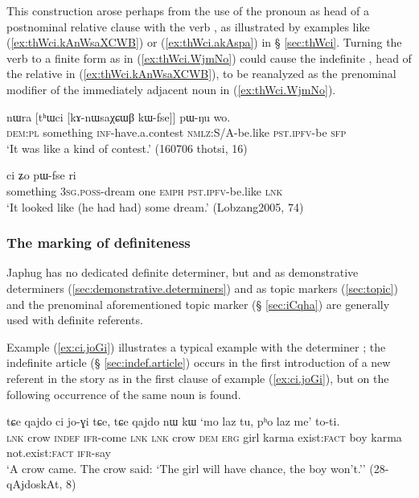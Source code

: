  This construction arose perhaps from the use of the pronoun  as head of a postnominal relative clause with the verb , as illustrated by examples like (\ref{ex:thWci.kAnWsaXCWB}) or (\ref{ex:thWci.akAspa}) in § \ref{sec:thWci}. Turning the verb  to a finite form as in (\ref{ex:thWci.WjmNo}) could cause the indefinite , head of the relative in (\ref{ex:thWci.kAnWsaXCWB}), to be reanalyzed as the prenominal modifier of the immediately adjacent noun in (\ref{ex:thWci.WjmNo}).

 \begin{exe}
\ex \label{ex:thWci.kAnWsaXCWB}
\gll nɯra [tʰɯci [kɤ-nɯsaχɕɯβ kɯ-fse]] pɯ-ŋu wo.  \\
\textsc{dem}:\textsc{pl} something \textsc{inf}-have.a.contest \textsc{nmlz}:S/A-be.like \textsc{pst}.\textsc{ipfv}-be \textsc{sfp} \\
\glt `It was like a kind of contest.' (160706 thotsi, 16)
 \end{exe}
 
\begin{exe}
\ex \label{ex:thWci.WjmNo}
 ci ʑo pɯ-fse ri \\
something \textsc{3sg}.\textsc{poss}-dream one \textsc{emph} \textsc{pst}.\textsc{ipfv}-be.like \textsc{lnk} \\
\glt `It looked like (he had had) some dream.' (Lobzang2005, 74)
 \end{exe}
 
 
\subsubsection{The marking of definiteness} \label{sec:definiteness}
Japhug has no dedicated definite determiner, but   and   as demonstrative determiners (\ref{sec:demonstrative.determiners}) and as topic markers (\ref{sec:topic}) and the prenominal aforementioned topic marker  (§ \ref{sec:iCqha}) are generally used with definite referents.  

Example (\ref{ex:ci.joGi}) illustrates a typical example with the determiner ; the indefinite article  (§ \ref{sec:indef.article}) occurs in the first introduction of a new referent in the story as in the first clause of example (\ref{ex:ci.joGi}), but on the following occurrence of the same noun  is found.

\begin{exe}
\ex \label{ex:ci.joGi}
 \gll  tɕe qajdo ci jo-ɣi tɕe, tɕe qajdo nɯ kɯ `mo laz tu, pʰo laz me' to-ti. \\
 \textsc{lnk} crow \textsc{indef} \textsc{ifr}-come \textsc{lnk} \textsc{lnk} crow \textsc{dem} \textsc{erg} girl karma exist:\textsc{fact} boy karma not.exist:\textsc{fact} \textsc{ifr}-say \\
 \glt `A crow came. The crow said: `The girl will have chance, the boy won't.'' (28-qAjdoskAt, 8)
\end{exe}

